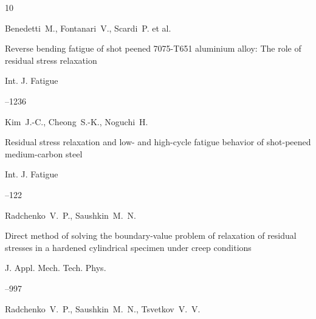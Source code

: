 \begin{thebibliography}{10}





\by Benedetti~M., Fontanari~V., Scardi~P. et al.

\paper Reverse bending fatigue of shot peened 7075-T651 aluminium alloy: The role of residual stress relaxation

\jour Int. J. Fatigue




--1236






\by  Kim~J.-C., Cheong~S.-K.,  Noguchi~H.

\paper Residual stress relaxation and low- and high-cycle fatigue behavior of shot-peened medium-carbon steel

\jour Int. J. Fatigue



--122







\by Radchenko~V.~P., Saushkin~M.~N.

\paper Direct method of solving the boundary-value problem of relaxation of residual stresses in a hardened cylindrical specimen under creep conditions

\jour J. Appl. Mech. Tech. Phys.




--997





\by Radchenko~V.~P., Saushkin~M.~N., Tsvetkov~V.~V.


\end{thebibliography}
